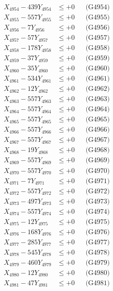 \documentclass[a4paper,10pt]{article}
\begin{document}
{\begin{align}
X_{4954} - 439Y_{4954} &\leq +0 && \text{(G4954)} \\
X_{4955} - 557Y_{4955} &\leq +0 && \text{(G4955)} \\
X_{4956} - 7Y_{4956} &\leq +0 && \text{(G4956)} \\
X_{4957} - 57Y_{4957} &\leq +0 && \text{(G4957)} \\
X_{4958} - 178Y_{4958} &\leq +0 && \text{(G4958)} \\
X_{4959} - 37Y_{4959} &\leq +0 && \text{(G4959)} \\
X_{4960} - 35Y_{4960} &\leq +0 && \text{(G4960)} \\
\allowbreak
X_{4961} - 534Y_{4961} &\leq +0 && \text{(G4961)} \\
X_{4962} - 12Y_{4962} &\leq +0 && \text{(G4962)} \\
X_{4963} - 557Y_{4963} &\leq +0 && \text{(G4963)} \\
X_{4964} - 557Y_{4964} &\leq +0 && \text{(G4964)} \\
X_{4965} - 557Y_{4965} &\leq +0 && \text{(G4965)} \\
X_{4966} - 557Y_{4966} &\leq +0 && \text{(G4966)} \\
X_{4967} - 557Y_{4967} &\leq +0 && \text{(G4967)} \\
X_{4968} - 19Y_{4968} &\leq +0 && \text{(G4968)} \\
X_{4969} - 557Y_{4969} &\leq +0 && \text{(G4969)} \\
X_{4970} - 557Y_{4970} &\leq +0 && \text{(G4970)} \\
\allowbreak
X_{4971} - 7Y_{4971} &\leq +0 && \text{(G4971)} \\
X_{4972} - 557Y_{4972} &\leq +0 && \text{(G4972)} \\
X_{4973} - 497Y_{4973} &\leq +0 && \text{(G4973)} \\
X_{4974} - 557Y_{4974} &\leq +0 && \text{(G4974)} \\
X_{4975} - 12Y_{4975} &\leq +0 && \text{(G4975)} \\
X_{4976} - 168Y_{4976} &\leq +0 && \text{(G4976)} \\
X_{4977} - 285Y_{4977} &\leq +0 && \text{(G4977)} \\
X_{4978} - 545Y_{4978} &\leq +0 && \text{(G4978)} \\
X_{4979} - 460Y_{4979} &\leq +0 && \text{(G4979)} \\
X_{4980} - 12Y_{4980} &\leq +0 && \text{(G4980)} \\
\allowbreak
X_{4981} - 47Y_{4981} &\leq +0 && \text{(G4981)} \\

\end{align}}
\end{document}
